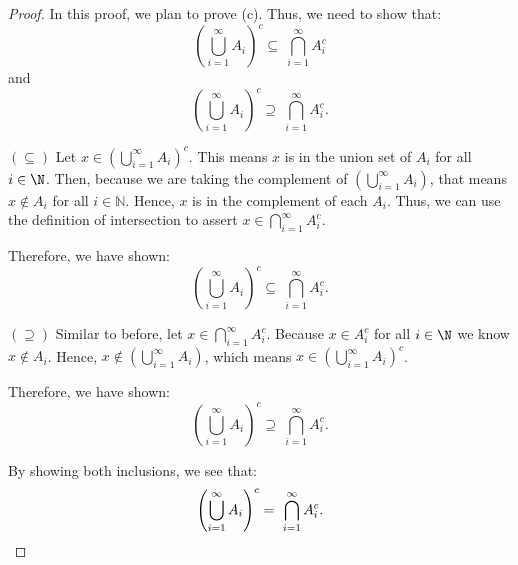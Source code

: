 \begin{customframedproof}[linecolor=horange!75]

    \begin{proof}
        In this proof, we plan to prove (c). Thus, we need to show that:
        \[
            \left( \bigcup_{i=1}^{\infty} A_i \right)^c \subseteq \ \bigcap_{i=1}^{\infty} A_i^c
        \]
        and
        \[
            \left( \bigcup_{i=1}^{\infty} A_i \right)^c \supseteq \ \bigcap_{i=1}^{\infty} A_i^c.
        \]
        \begin{proofpart}[horange]{\((\subseteq)\)}
            Let \(x \in \left( \bigcup_{i=1}^{\infty} A_i \right)^c\). This means \(x\) is in the union set of \(A_i\) for all \(i \in \N\). Then, because we are taking the complement of \(\left( \bigcup_{i=1}^{\infty} A_i \right)\), that means \(x \notin A_i\) for all \(i \in \mathbb{N}\). Hence, \(x\) is in the complement of each \(A_i\). Thus, we can use the definition of intersection to assert \(x \in \bigcap_{i=1}^{\infty} A_i^c\).

            Therefore, we have shown:
            \[
                \left( \bigcup_{i=1}^{\infty} A_i \right)^c \subseteq \ \bigcap_{i=1}^{\infty} A_i^c.
            \]
        \end{proofpart}
        \vspace{2mm}
        \begin{proofpart}[horange]{\((\supseteq)\)}
            Similar to before, let \(x \in \bigcap_{i=1}^{\infty} A_i^c\). Because \(x \in A^c_i\) for all \(i \in \N\) we know \(x \notin A_i\). Hence, \(x \notin \left(\bigcup_{i=1}^{\infty} A_i\right)\), which means \(x \in \left( \bigcup_{i=1}^{\infty} A_i \right)^c\).

            Therefore, we have shown:
            \[
                \left( \bigcup_{i=1}^{\infty} A_i \right)^c \supseteq \ \bigcap_{i=1}^{\infty} A_i^c.
            \]
        \end{proofpart}


        By showing both inclusions, we see that:
        \[
            \left( \bigcup_{i=1}^{\infty} A_i \right)^c = \ \bigcap_{i=1}^{\infty} A_i^c. \qedhere
        \] 
    \end{proof}


\end{customframedproof}